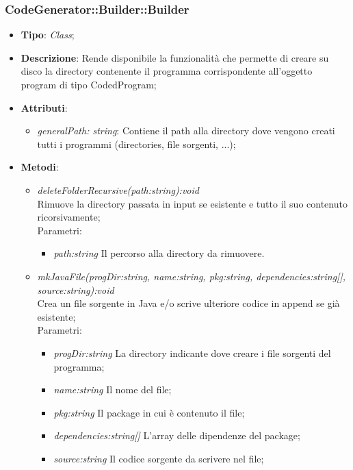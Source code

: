 \documentclass[../DefinizioneDiProdotto.tex]{subfiles}
\begin{document}
			
			\subsubsection{CodeGenerator::Builder::Builder}
			\hypertarget{SWEDesigner::Server::CodeGenerator::Builder::Builder}{}
			\begin{itemize}
				\item \textbf{Tipo}: \emph{Class};
				\item \textbf{Descrizione}: Rende disponibile la funzionalità che permette di creare su disco la directory contenente il programma corrispondente all'oggetto program di tipo CodedProgram; \\
				\item \textbf{Attributi}:
				\begin{itemize}
					\item \emph{generalPath: string}: Contiene il path alla directory dove vengono creati tutti i programmi (directories, file sorgenti, ...);
				\end{itemize}
				\item \textbf{Metodi}:
				\begin{itemize}
					\item \emph{deleteFolderRecursive(path:string):void} \\ 
					Rimuove la directory passata in input se esistente e tutto il suo contenuto ricorsivamente; \\
					Parametri:
					\begin{itemize}
						\item \emph{path:string} Il percorso alla directory da rimuovere.
					\end{itemize}
					
					\item \emph{mkJavaFile(progDir:string, name:string, pkg:string, dependencies:string[], source:string):void} \\ 
					Crea un file sorgente in Java e/o scrive ulteriore codice in append se già esistente; \\
					Parametri:
					\begin{itemize}
						\item \emph{progDir:string} La directory indicante dove creare i file sorgenti del programma;
						\item \emph{name:string} Il nome del file;
						\item \emph{pkg:string} Il package in cui è contenuto il file;
						\item \emph{dependencies:string[]} L'array delle dipendenze del package;
						\item \emph{source:string} Il codice sorgente da scrivere nel file;
					\end{itemize}
					

\end{itemize}
\end{itemize}
\end{document}
